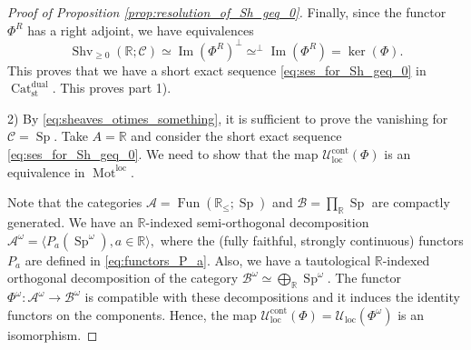 \documentclass[11pt,leqno]{amsart}
\numberwithin{equation}{section}
\def\R{\mathbb{R}}
\newcommand{\biggplus}[1][]{\mathop{\bigoplus}\limits_{#1}}
\newcommand{\prodd}[1][]{\mathop{\prod}\limits_{#1}}
\newcommand{\xto}{\xrightarrow}
\newcommand{\Mot}{\operatorname{Mot}}
\newcommand{\Cat}{\operatorname{Cat}}
\newcommand{\Cone}{\operatorname{Cone}}
\newcommand{\loc}{\operatorname{loc}}
\newcommand{\cont}{\operatorname{cont}}
\newcommand{\st}{\operatorname{st}}
\newcommand{\dual}{\operatorname{dual}}
\newcommand{\cA}{{\mathcal A}}
\newcommand{\cB}{{\mathcal B}}
\newcommand{\cC}{{\mathcal C}}
\newcommand{\cU}{{\mathcal U}}
\newcommand{\la}{\langle}
\newcommand{\ra}{\rangle}
\newcommand{\Fun}{\operatorname{Fun}}
\newcommand{\Sh}{\operatorname{Shv}}
\newcommand{\im}{\operatorname{Im}}
\newcommand{\Sp}{\operatorname{Sp}}
\begin{document}
\begin{proof}[Proof of Proposition \ref{prop:resolution_of_Sh_geq_0}]
Finally, since the functor $\Phi^R$ has a right adjoint, we have equivalences
$$\Sh_{\geq 0}(\R;\cC)\simeq \im(\Phi^R)^{\perp}\simeq ^{\perp}\im(\Phi^R)=\ker(\Phi).$$ 
This proves that we have a short exact sequence \eqref{eq:ses_for_Sh_geq_0} in $\Cat_{\st}^{\dual}.$ 
This proves part 1). 

2) By \eqref{eq:sheaves_otimes_something}, it is sufficient to prove the vanishing for $\cC=\Sp.$ Take $A=\R$ and consider the short exact sequence \eqref{eq:ses_for_Sh_geq_0}. We need to show that the map $\cU_{\loc}^{\cont}(\Phi)$ is an equivalence in $\Mot^{\loc}.$ 

Note that the categories $\cA=\Fun(\R_{\leq};\Sp)$ and $\cB=\prodd[\R]\Sp$ are compactly generated. We have an $\R$-indexed semi-orthogonal decomposition $\cA^{\omega}=\la P_a(\Sp^{\omega}), a\in\R\ra,$ where the (fully faithful, strongly continuous) functors $P_a$ are defined in \eqref{eq:functors_P_a}. Also, we have a tautological $\R$-indexed orthogonal decomposition of the category $\cB^{\omega}\simeq\biggplus[\R]\Sp^{\omega}.$ The functor $\Phi^{\omega}:\cA^{\omega}\to\cB^{\omega}$ is compatible with these decompositions and it induces the identity functors on the components. Hence, the map $\cU_{\loc}^{\cont}(\Phi)=\cU_{\loc}(\Phi^{\omega})$ is an isomorphism.
\end{proof}
\end{document}
